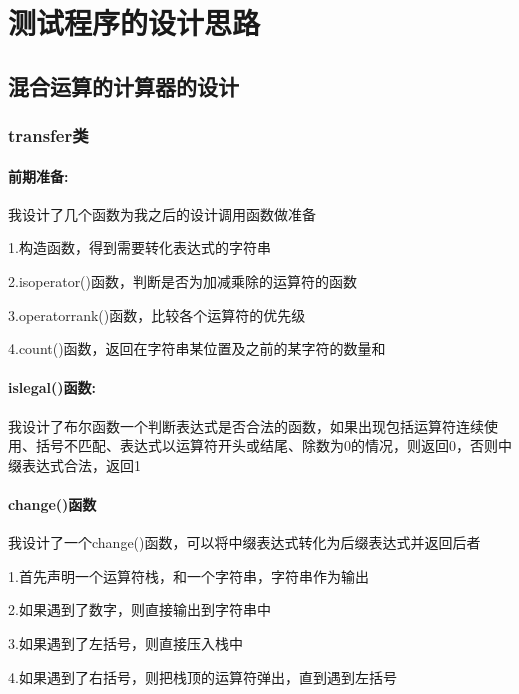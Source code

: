 \documentclass[UTF8]{ctexart}
\begin{document}
	
	\pagestyle{fancy}
	\fancyhead{}
	
	\section{测试程序的设计思路}
	    
	\subsection{混合运算的计算器的设计}
	
	\subsubsection{transfer类}
	
	\paragraph{前期准备:}我设计了几个函数为我之后的设计调用函数做准备		
	
	1.构造函数，得到需要转化表达式的字符串
	
	2.isoperator()函数，判断是否为加减乘除的运算符的函数
	
	3.operatorrank()函数，比较各个运算符的优先级
	
	4.count()函数，返回在字符串某位置及之前的某字符的数量和
	
	\paragraph{islegal()函数:}
	
	我设计了布尔函数一个判断表达式是否合法的函数，如果出现包括运算符连续使用、括号不匹配、表达式以运算符开头或结尾、除数为0的情况，则返回0，否则中缀表达式合法，返回1
	
	\paragraph{change()函数}
	
	我设计了一个change()函数，可以将中缀表达式转化为后缀表达式并返回后者	
	
	1.首先声明一个运算符栈，和一个字符串，字符串作为输出
	
	2.如果遇到了数字，则直接输出到字符串中
	
	3.如果遇到了左括号，则直接压入栈中
	
	4.如果遇到了右括号，则把栈顶的运算符弹出，直到遇到左括号
	
\end{document}
